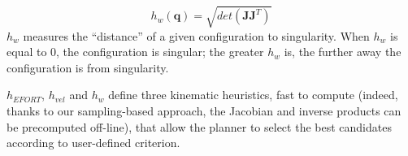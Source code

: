 \begin{equation} \label{ellipsoid}
h_{w}(\mathbf{q}) = \sqrt{det(\mathbf{J}\mathbf{J}^T)}
\end{equation}
$h_{w}$ measures the ``distance'' of a given configuration to singularity. When $h_{w}$ is equal to 0, the configuration is singular;
the greater $h_{w}$ is, the further away the configuration is from singularity.

$h_{EFORT}$, $h_{vel}$ and $h_{w}$ define three kinematic heuristics, fast to compute (indeed, thanks to our sampling-based approach, the Jacobian and inverse products
can be precomputed off-line), that allow the planner to select the best
candidates according to user-defined criterion.




